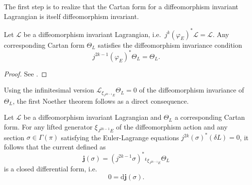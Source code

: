 The first step is to realize that the Cartan form for a diffeomorphism invariant Lagrangian is itself diffeomorphism invariant.
\begin{proposition}\label{prop_cartan_diffeo}
  Let $\mathscr L$ be a diffeomorphism invariant Lagrangian, i.e.\ $j^k(\varphi_E)^\ast \mathscr L=\mathscr L$. Any corresponding Cartan form $\Theta_L$ satisfies the diffeomorphism invariance condition
  \begin{equation}
    j^{2k-1}(\varphi_E)^\ast \Theta_L = \Theta_L.
  \end{equation}
\end{proposition}
\begin{proof}
  See \cite{Abraham_1987,Gotay_1998}.
\end{proof}
Using the infinitesimal version $\mathcal L_{\xi_{J^{2k-1}E}} \Theta_L = 0$ of the diffeomorphism invariance of $\Theta_L$, the first Noether theorem follows as a direct consequence.
\begin{theorem}\label{thm_first_noether}
  Let $\mathscr L$ be a diffeomorphism invariant Lagrangian and $\Theta_L$ a corresponding Cartan form. For any lifted generator $\xi_{J^{2k-1}E}$ of the diffeomorphism action and any section $\sigma\in\Gamma(\pi)$ satisfying the Euler-Lagrange equations $j^{2k}(\sigma)^\ast(\delta L)=0$, it follows that the current defined as
  \begin{equation}
    \boldsymbol{j}(\sigma) = (j^{2k-1}\sigma)^\ast \iota_{\xi_{J^{2k-1}E}} \Theta_L
  \end{equation}
  is a closed differential form, i.e.
  \begin{equation}\label{first_noether_eq}
    0 = \mathrm d \boldsymbol{j}(\sigma).
  \end{equation}
\end{theorem}
